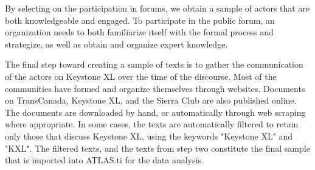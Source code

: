 % 

By selecting on the participation in forums, we obtain a sample of actors that are both knowledgeable and engaged. To participate in the public forum, an organization needs to both familiarize itself with the formal process and strategize, as well as obtain and organize expert knowledge. 

The final step toward creating a sample of texts is to gather the communication of the actors on Keystone XL over the time of the discourse. Most of the communities have formed and organize themselves through websites. Documents on TransCanada, Keystone XL, and the Sierra Club are also published online. The documents are downloaded by hand, or automatically through web scraping where appropriate. In some cases, the texts are automatically filtered to retain only those that discuss Keystone XL, using the keywords "Keystone XL" and "KXL". The filtered texts, and the texts from step two constitute the final sample that is imported into ATLAS.ti for the data analysis.

